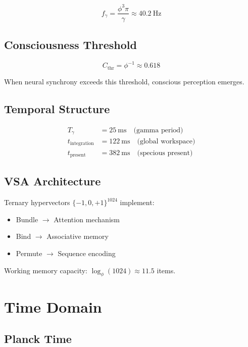 \documentclass[12pt,a4paper]{article}
\begin{document}
\begin{equation}
f_\gamma = \frac{\phi^3 \pi}{\gamma} \approx 40.2~\text{Hz}
\end{equation}

\subsection{Consciousness Threshold}

\begin{equation}
C_{\text{thr}} = \phi^{-1} \approx 0.618
\end{equation}

When neural synchrony exceeds this threshold, conscious perception emerges.

\subsection{Temporal Structure}

\begin{align}
T_\gamma &= 25~\text{ms} \quad \text{(gamma period)} \\
t_{\text{integration}} &= 122~\text{ms} \quad \text{(global workspace)} \\
t_{\text{present}} &= 382~\text{ms} \quad \text{(specious present)}
\end{align}

\subsection{VSA Architecture}

Ternary hypervectors $\{-1, 0, +1\}^{1024}$ implement:
\begin{itemize}
\item Bundle $\rightarrow$ Attention mechanism
\item Bind $\rightarrow$ Associative memory
\item Permute $\rightarrow$ Sequence encoding
\end{itemize}

Working memory capacity: $\log_\phi(1024) \approx 11.5$ items.

\section{Time Domain}

\subsection{Planck Time}
\end{document}

